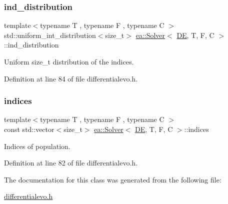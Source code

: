 \subsubsection{\texorpdfstring{ind\+\_\+distribution}{ind\_distribution}}
{\footnotesize\ttfamily template$<$typename T , typename F , typename C $>$ \\
std\+::uniform\+\_\+int\+\_\+distribution$<$size\+\_\+t$>$ \hyperlink{classea_1_1_solver}{ea\+::\+Solver}$<$ \hyperlink{structea_1_1_d_e}{DE}, T, F, C $>$\+::ind\+\_\+distribution\hspace{0.3cm}{\ttfamily [private]}}



Uniform size\+\_\+t distribution of the indices. 



Definition at line 84 of file differentialevo.\+h.

\mbox{\label{classea_1_1_solver_3_01_d_e_00_01_t_00_01_f_00_01_c_01_4_a8428ecceaab1c7e26715ed2f72654693}} 
\subsubsection{\texorpdfstring{indices}{indices}}
{\footnotesize\ttfamily template$<$typename T , typename F , typename C $>$ \\
const std\+::vector$<$size\+\_\+t$>$ \hyperlink{classea_1_1_solver}{ea\+::\+Solver}$<$ \hyperlink{structea_1_1_d_e}{DE}, T, F, C $>$\+::indices\hspace{0.3cm}{\ttfamily [private]}}



Indices of population. 



Definition at line 82 of file differentialevo.\+h.



The documentation for this class was generated from the following file\+:\begin{DoxyCompactItemize}
\item 
\hyperlink{differentialevo_8h}{differentialevo.\+h}\end{DoxyCompactItemize}

